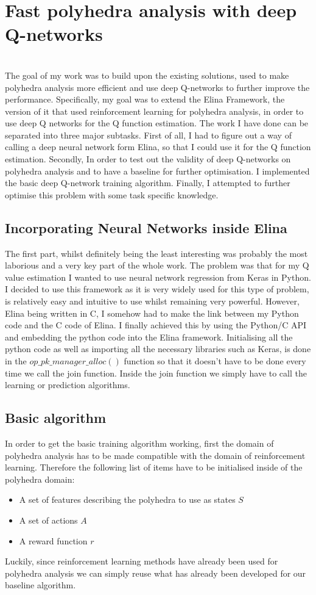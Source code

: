 
\chapter{Fast polyhedra analysis with deep Q-networks}
\mbox{}\\
The goal of my work was to build upon the existing solutions, used to make polyhedra analysis more efficient and use deep Q-networks to further improve the performance. Specifically, my goal was to extend the Elina Framework, the version of it that used reinforcement learning for polyhedra analysis, in order to use deep Q networks for the Q function estimation. The work I have done can be separated into three major subtasks. First of all, I had to figure out a way of calling a deep neural network form Elina, so that I could use it for the Q function estimation. Secondly, In order to test out the validity of deep Q-networks on polyhedra analysis and to have a baseline for further optimisation. I implemented the basic deep Q-network training algorithm. Finally, I attempted to further optimise this problem with some task specific knowledge.
\section{Incorporating Neural Networks inside Elina}
The first part, whilst definitely being the least interesting was probably the most laborious and a very key part of the whole work. The problem was that for my Q value estimation I wanted to use neural network regression from Keras in Python. I decided to use this framework as it is very widely used for this type of problem, is relatively easy and intuitive to use whilst remaining very powerful. However, Elina being written in C, I somehow had to make the link between my Python code and the C code of Elina. I finally achieved this by using the Python/C API and embedding the python code into the Elina framework. Initialising all the python code as well as importing all the necessary libraries such as Keras, is done in the $op\_pk\_manager\_alloc()$ function so that it doesn't have to be done every time we call the join function. Inside the join function we simply have to call the learning or prediction algorithms.
\section{Basic algorithm}
In order to get the basic training algorithm working, first the domain of polyhedra analysis has to be made compatible with the domain of reinforcement learning. Therefore the following list of items have to be initialised inside of the polyhedra domain:
\begin{itemize}
	\item A set of features describing the polyhedra to use as states $S$
	\item A set of actions $A$
	\item A reward function $r$
\end{itemize}
Luckily, since reinforcement learning methods have already been used for polyhedra analysis we can simply reuse what has already been developed for our baseline algorithm.\\
